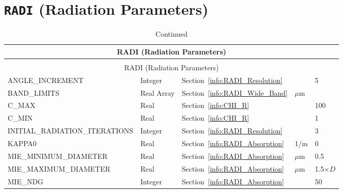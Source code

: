 \documentclass[11pt]{book}
\begin{document}
\vspace{\baselineskip}

\section{\texorpdfstring{{\tt RADI}}{RADI} (Radiation Parameters)}

\begin{longtable}{@{\extracolsep{\fill}}|l|l|l|l|l|}
\caption[Radiation parameters ({\ct RADI} namelist group)]{For more information see Section~\ref{info:RADI}.}
\label{tbl:RADI} \\
\hline
\multicolumn{5}{|c|}{{\ct RADI} (Radiation Parameters)} \\
\hline \hline
\endfirsthead
\caption[]{Continued} \\
\hline
\multicolumn{5}{|c|}{{\ct RADI} (Radiation Parameters)} \\
\hline \hline
\endhead
{\ct ANGLE\_INCREMENT}              & Integer       & Section~\ref{info:RADI_Resolution}        &                   & 5                 \\ \hline
{\ct BAND\_LIMITS    }              & Real Array    & Section~\ref{info:RADI_Wide_Band}         & $\mu$m            &                   \\ \hline
{\ct C\_MAX                   }     & Real          & Section~\ref{info:CHI_R}                  &                   & 100               \\ \hline
{\ct C\_MIN                   }     & Real          & Section~\ref{info:CHI_R}                  &                   & 1                 \\ \hline
{\ct INITIAL\_RADIATION\_ITERATIONS}& Integer       & Section~\ref{info:RADI_Resolution}        &                   & 3                 \\ \hline
{\ct KAPPA0                   }     & Real          & Section~\ref{info:RADI_Absorption}        & 1/m               & 0                 \\ \hline
{\ct MIE\_MINIMUM\_DIAMETER}        & Real          & Section~\ref{info:RADI_Absorption}        & $\mu$m            & 0.5               \\ \hline
{\ct MIE\_MAXIMUM\_DIAMETER}        & Real          & Section~\ref{info:RADI_Absorption}        & $\mu$m            & 1.5$\times D$     \\ \hline
{\ct MIE\_NDG}                      & Integer       & Section~\ref{info:RADI_Absorption}        &                   & 50                \\ \hline

\end{longtable}
\end{document}
